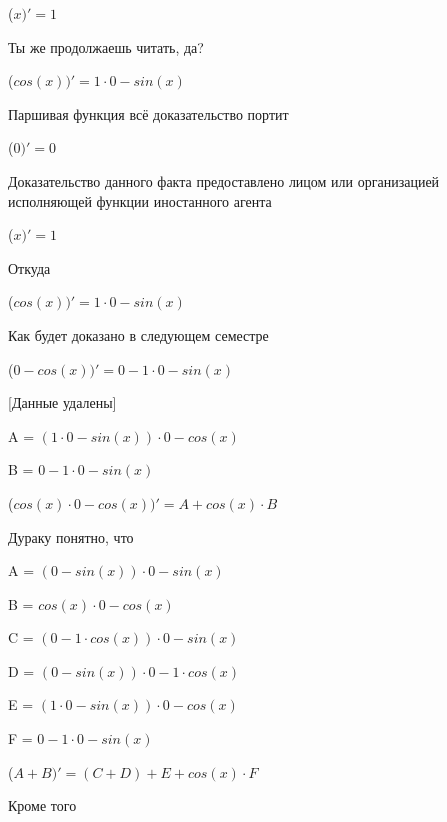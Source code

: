 \documentclass[12pt,a4paper,fleqn]{article}
\begin{document}
\begin{center}
 ($x)'
  = 1$\end{center}
Ты же продолжаешь читать, да?

\begin{center}
 ($cos(x))'
  = 1 \cdot 0-sin(x)$\end{center}
Паршивая функция всё доказательство портит\cite{link2}

\begin{center}
 ($0)'
  = 0$\end{center}
Доказательство данного факта предоставлено лицом или организацией исполняющей функции иностанного агента

\begin{center}
 ($x)'
  = 1$\end{center}
Откуда

\begin{center}
 ($cos(x))'
  = 1 \cdot 0-sin(x)$\end{center}
Как будет доказано в следующем семестре

\begin{center}
 ($0-cos(x))'
  = 0-1 \cdot 0-sin(x)$\end{center}
[Данные удалены]

\begin{center}
A = $(1 \cdot 0-sin(x)) \cdot 0-cos(x)$\end{center}
\begin{center}
B = $0-1 \cdot 0-sin(x)$\end{center}
\begin{center}
 ($cos(x) \cdot 0-cos(x))'
  = A+cos(x) \cdot B$\end{center}
Дураку понятно, что

\begin{center}
A = $(0-sin(x)) \cdot 0-sin(x)$\end{center}
\begin{center}
B = $cos(x) \cdot 0-cos(x)$\end{center}
\begin{center}
C = $(0-1 \cdot cos(x)) \cdot 0-sin(x)$\end{center}
\begin{center}
D = $(0-sin(x)) \cdot 0-1 \cdot cos(x)$\end{center}
\begin{center}
E = $(1 \cdot 0-sin(x)) \cdot 0-cos(x)$\end{center}
\begin{center}
F = $0-1 \cdot 0-sin(x)$\end{center}
\begin{center}
 ($A+B)'
  = (C+D)+E+cos(x) \cdot F$\end{center}
Кроме того
\end{document}
